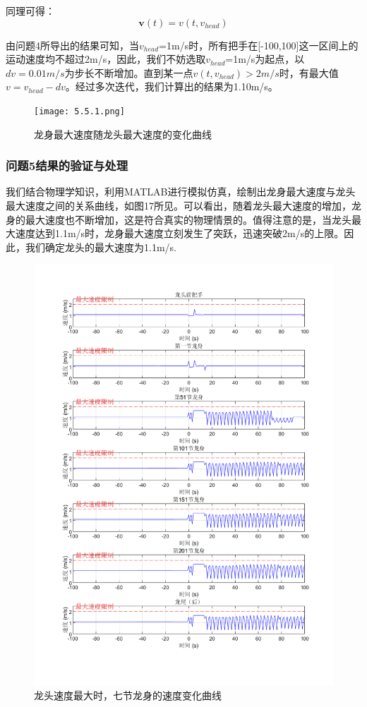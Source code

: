 \documentclass{cumcmthesis1}
\begin{document}
\par
同理可得：
\begin{equation}
    \textbf{v}(t) = v(t,v_{head})
\end{equation}
\par
由问题4所导出的结果可知，当$v_{head}$=1m/s时，所有把手在[-100,100]这一区间上的运动速度均不超过2m/s，因此，我们不妨选取$v_{head}$=1m/s为起点，以$dv=0.01m/s$为步长不断增加。直到某一点$v(t,v_{head}) >2m/s$时，有最大值$v=v_{head}-dv$。经过多次迭代，我们计算出的结果为1.10m/s。
\begin{figure}[htbp]
    \caption{龙身最大速度随龙头最大速度的变化曲线}
    \centering    
    \texttt{[image: 5.5.1.png]}
\end{figure}

\subsubsection{问题5结果的验证与处理}
我们结合物理学知识，利用MATLAB进行模拟仿真，绘制出龙身最大速度与龙头最大速度之间的关系曲线，如图17所见。可以看出，随着龙头最大速度的增加，龙身的最大速度也不断增加，这是符合真实的物理情景的。值得注意的是，当龙头最大速度达到1.1m/s时，龙身最大速度立刻发生了突跃，迅速突破2m/s的上限。因此，我们确定龙头的最大速度为1.1m/s.

\begin{figure}[htbp]
    \caption{龙头速度最大时，七节龙身的速度变化曲线}
    \centering    
    \includegraphics[width=0.7\linewidth]{5.5.3.png}
\end{figure}
\end{document}
